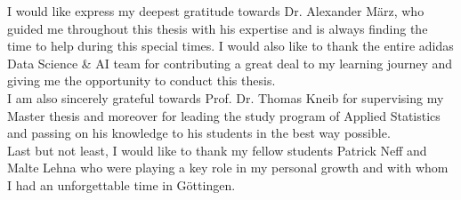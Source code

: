 
\vspace{3cm}



I would like express my deepest gratitude towards Dr. Alexander März, who guided me throughout this thesis with his expertise and is always finding the time to help during this special times. I would also like to thank the entire adidas Data Science \& AI team for contributing a great deal to my learning journey and giving me the opportunity to conduct this thesis.\\
I am also sincerely grateful towards Prof. Dr. Thomas Kneib for supervising my Master thesis and moreover for leading the study program of Applied Statistics and passing on his knowledge to his students in the best way possible.\\
Last but not least, I would like to thank my fellow students Patrick Neff and Malte Lehna who were playing a key role in my personal growth and with whom I had an unforgettable time in Göttingen. 

\vspace{1.5cm}


\textbf{}


